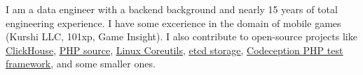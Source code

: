 I am a data engineer with a backend background and nearly 15 years of total
engineering experience. I have some excerience in the domain of mobile games
(Kurshi LLC, 101xp, Game Insight). I
also contribute to open-source projects like
\href{https://github.com/ClickHouse/ClickHouse/pulls?q=is\%3Apr+is\%3Aclosed+author\%3AGSokol}{\underline{ClickHouse}},
\href{https://github.com/php/php-src/pulls?q=is\%3Apr+is\%3Aclosed+author\%3AGSokol}{\underline{PHP source}},
\href{https://github.com/coreutils/coreutils/commits?author=GSokol}{\underline{Linux Coreutils}},
\href{https://github.com/etcd-io/etcd/pulls?q=is\%3Apr+is\%3Aclosed+author\%3AGSokol}{\underline{etcd storage}},
\href{https://github.com/Codeception/Codeception/pulls?q=is\%3Apr+is\%3Aclosed+author\%3AGSokol}{\underline{Codeception PHP test framework}},
and some smaller ones.
